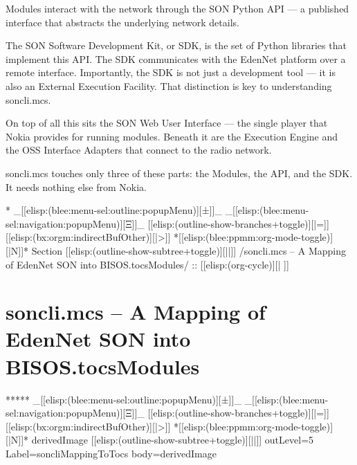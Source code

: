 \begin{verblatex}
\begin{frame}[fragile,plain,label=nokiaSonPartsListSoncli]
{  Modules interact with the network through the SON Python API --- a published interface
  that abstracts the underlying network details.

  The SON Software Development Kit, or SDK, is the set of Python libraries that
  implement this API. The SDK communicates with the EdenNet platform over a remote
  interface. Importantly, the SDK is not just a development tool --- it is also an
  External Execution Facility. That distinction is key to understanding soncli.mcs.

  On top of all this sits the SON Web User Interface --- the single player that Nokia
  provides for running modules. Beneath it are the Execution Engine and the OSS
  Interface Adapters that connect to the radio network.

  soncli.mcs touches only three of these parts: the Modules, the API, and the SDK.
  It needs nothing else from Nokia.
}

\end{frame}
\end{verblatex}


\begin{whenOrg}
*  _[[elisp:(blee:menu-sel:outline:popupMenu)][±]]_ _[[elisp:(blee:menu-sel:navigation:popupMenu)][Ξ]]_ [[elisp:(outline-show-branches+toggle)][|=]] [[elisp:(bx:orgm:indirectBufOther)][|>]] *[[elisp:(blee:ppmm:org-mode-toggle)][|N]]*  Section    [[elisp:(outline-show-subtree+toggle)][||]]   /soncli.mcs -- A Mapping of EdenNet SON into BISOS.tocsModules/ ::  [[elisp:(org-cycle)][| ]]
\end{whenOrg}

\section{soncli.mcs -- A Mapping of EdenNet SON into BISOS.tocsModules}


\begin{whenOrg}
*****  _[[elisp:(blee:menu-sel:outline:popupMenu)][±]]_ _[[elisp:(blee:menu-sel:navigation:popupMenu)][Ξ]]_ [[elisp:(outline-show-branches+toggle)][|=]] [[elisp:(bx:orgm:indirectBufOther)][|>]] *[[elisp:(blee:ppmm:org-mode-toggle)][|N]]*  derivedImage [[elisp:(outline-show-subtree+toggle)][||]] outLevel=5 Label=soncliMappingToTocs  body=derivedImage

\end{whenOrg}

